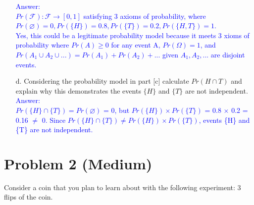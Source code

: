 \documentclass[letterpaper, 11pt]{article}
\begin{document}
\begin{itemize}
\textcolor{blue}{Answer: \\
$Pr(\mathcal{F}): \mathcal{F} \rightarrow [0, 1]$ satisfying 3 axioms of probability, where $Pr(\varnothing) = 0, Pr(\{H\}) = 0.8, Pr(\{T\}) = 0.2, Pr(\{H, T\}) = 1$.}\\

\textcolor{blue}{Yes, this could be a legitimate probability model because it meets 3 xioms of probability where $Pr(A) \ge 0$ for any event A, $Pr(\Omega) = 1$, and $Pr(A_1 \cup A_2 \cup ...) = Pr(A_1) + Pr(A_2) + ...$ given $ A_1, A_2, ...$ are disjoint events.}\\


\item[d.] Considering the probability model in part [c] calculate $Pr(H \cap T)$ and explain why this demonstrates the events $\{ H\}$ and $\{ T \}$ are not independent.  \\

\textcolor{blue}{Answer: \\
$Pr(\{H\} \cap \{T\}) = Pr(\varnothing)$ = 0, but $Pr(\{H\}) \times Pr(\{T\})$ = 0.8 $\times$ 0.2 = 0.16 $\neq$ 0. Since $Pr(\{H\} \cap \{T\}) \neq Pr(\{H\}) \times Pr(\{T\})$, events \{H\} and \{T\} are not independent.}\\

\end{itemize}


\section*{Problem 2 (Medium)}

Consider a coin that you plan to learn about with the following experiment: 3 flips of the coin.
\end{document}

